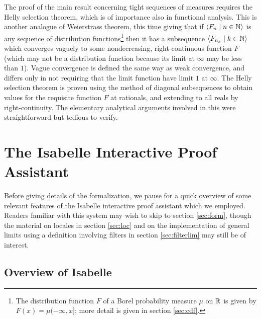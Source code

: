 \documentclass[leqno]{article}
\theoremstyle{definition}
\newcommand{\bldseq}[2]{\langle{#1}\mid{#2}\rangle}
\begin{document}
The proof of the main result concerning tight sequences of measures requires the Helly selection theorem, which is of importance also in functional analysis. This is another analogue of Weierstrass theorem, this time giving that if $\bldseq{F_n}{n \in \N}$ is any sequence of distribution functions\footnote{The distribution function $F$ of a Borel probability measure $\mu$ on $\mathbb{R}$ is given by $F(x) = \mu(-\infty, x]$; more detail is given in section \ref{sec:cdf}.} then it has a subsequence $\bldseq{F_{n_k}}{k \in \N}$ which converges vaguely to some nondecreasing, right-continuous function $F$ (which may not be a distribution function because its limit at $\infty$ may be less than $1$). Vague convergence is defined the same way as weak convergence, and differs only in not requiring that the limit function have limit $1$ at $\infty$. The Helly selection theorem is proven using the method of diagonal subsequences to obtain values for the requisite function $F$ at rationals, and extending to all reals by right-continuity. The elementary analytical arguments involved in this were straightforward but tedious to verify.

\section{The Isabelle Interactive Proof Assistant}

Before giving details of the formalization, we pause for a quick overview of some relevant features of the Isabelle interactive proof assistant which we employed. Readers familiar with this system may wish to skip to section \ref{sec:form}, though the material on locales in section \ref{sec:loc} and on the implementation of general limits using a definition involving filters in section \ref{sec:filterlim} may still be of interest.

\subsection{Overview of Isabelle}
\end{document}
